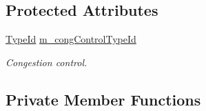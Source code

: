 \subsection*{Protected Attributes}
\begin{DoxyCompactItemize}
\item 
\hyperlink{classns3_1_1TypeId}{Type\+Id} \hyperlink{classns3_1_1TcpGeneralTest_aa85b87bfde4d43e1f799f297fe689a8d}{m\+\_\+cong\+Control\+Type\+Id}
\begin{DoxyCompactList}\small\item\em Congestion control. \end{DoxyCompactList}\end{DoxyCompactItemize}
\subsection*{Private Member Functions}
